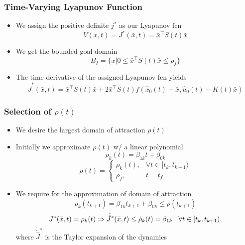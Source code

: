 \documentclass{beamer}
\begin{document}
\begin{frame}
\frametitle{Time-Varying Lyapunov Function}
\begin{itemize}
\item We assign the positive definite $j^{\ast}$ as our Lyapunov fcn
\begin{equation*}
V(x,t)=J^{\ast}(\bar{x},t) = \bar{x}^{\intercal}S(t)\bar{x}
\end{equation*} 
\item We get the bounded goal domain 
\begin{equation*}
B_f=\{ x|0\leq  \bar{x}^{\intercal}S(t)\bar{x} \leq \rho_f \} 
\end{equation*} 
\item The time derivative of the assigned Lyapunov fcn yields
\begin{equation*}
\dot{J}^{\ast}(\bar{x},t) = \bar{x}^{\intercal}\dot{S}(t)\bar{x} + 2\bar{x}^{\intercal}S(t)f(\hat{x}_0(t)+\bar{x}, \hat{u}_0(t)-K(t)\bar{x})
\end{equation*}
\end{itemize}

\end{frame}


\begin{frame}
\frametitle{Selection of $\rho(t)$}
\begin{itemize}
\item We desire the largest domain of attraction $\rho(t)$ 
\item Initially we approximate $\rho(t)$ w/ a linear polynomial
\begin{equation*}
\rho_k(t) = \beta_{1k}t + \beta_{0k}
\end{equation*} 
\begin{equation*}
\rho(t) = 
	\begin{cases}
		\rho_k(t),  & \forall t \in [t_k, t_{k+1}) \\
		\rho_f, & t=t_f
	\end{cases}
\end{equation*}
\item We require for the approximation of domain of attraction  
\begin{equation*}
\rho_k(t_{k+1})=\beta_{1k}t_{k+1}+\beta_{0k} \leq \rho(t_{k+1})
\end{equation*} 
\begin{equation*}
J^{\ast}(\bar{x},t)= \rho_k (t) \Rightarrow \dot{\hat{J}}^{\ast}(\bar{x},t) \leq \dot{\rho}_k(t) = \beta_{1k} \hspace{.3cm} \forall t \in [t_k,t_{k+1}),
\end{equation*} 
where $\dot{\hat{J}}^{\ast}$ is the Taylor expansion of the dynamics
\end{itemize}

\end{frame}
\end{document}
